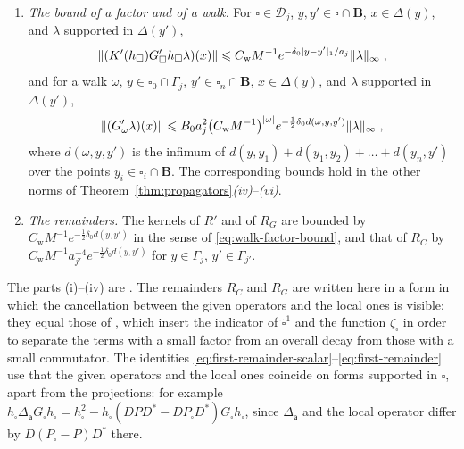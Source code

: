 \documentclass[11pt]{preprint}
\DeclarePairedDelimiter{\abs}{\lvert}{\rvert}
\DeclarePairedDelimiter{\norm}{\lVert}{\rVert}
\numberwithin{equation}{section}
\begin{document}
\begin{theorem}
\begin{enumerate}[label=(\roman*)]
\item \emph{The bound of a factor and of a walk.} For $\square \in \mathscr D_j$, $y, y' \in \square \cap \mathbf B$, $x \in \Delta(y)$, and $\lambda$ supported in $\Delta(y')$,
\begin{equation}\label{eq:walk-factor-bound}
    \norm{(K'(h_\square)G'_\square h_\square\lambda)(x)} \leqslant C_{\mathrm w}M^{-1}e^{-\delta_0\abs{y - y'}_1/a_j}\norm\lambda_\infty\;,
\end{equation}
and for a walk $\omega$, $y \in \square_0 \cap \Gamma_j$, $y' \in \square_n \cap \mathbf B$, $x \in \Delta(y)$, and $\lambda$ supported in $\Delta(y')$,
\begin{equation}\label{eq:walk-bound}
    \norm{(G'_\omega\lambda)(x)} \leqslant B_0a_j^2\bigl(C_{\mathrm w}M^{-1}\bigr)^{\abs\omega}e^{-\frac{1}{2}\delta_0d(\omega, y, y')}\norm\lambda_\infty\;,
\end{equation}
where $d(\omega, y, y')$ is the infimum of $d(y, y_1) + d(y_1, y_2) + \dots + d(y_n, y')$ over the points $y_i \in \square_i \cap \mathbf B$. The corresponding bounds hold in the other norms of Theorem~\ref{thm:propagators}\emph{(iv)}--\emph{(vi)}.
\item \emph{The remainders.} The kernels of $R'$ and of $R_G$ are bounded by $C_{\mathrm w}M^{-1}e^{-\frac{1}{2}\delta_0d(y, y')}$ in the sense of \eqref{eq:walk-factor-bound}, and that of $R_C$ by $C_{\mathrm w}M^{-1}a_{j'}^{-4}e^{-\frac{1}{2}\delta_0d(y, y')}$ for $y \in \Gamma_j$, $y' \in \Gamma_{j'}$.
\end{enumerate}
\end{theorem}

The parts (i)--(iv) are \cite[(3.87)--(3.96), (3.104)--(3.106), Theorem~3.7, Corollary~3.8]{BalabanPBG}. The remainders $R_C$ and $R_G$ are written here in a form in which the cancellation between the given operators and the local ones is visible; they equal those of \cite[(3.95), (3.105)]{BalabanPBG}, which insert the indicator of $\tilde\square^1$ and the function $\zeta_\square$ in order to separate the terms with a small factor from an overall decay from those with a small commutator. The identities \eqref{eq:first-remainder-scalar}--\eqref{eq:first-remainder} use that the given operators and the local ones coincide on forms supported in $\square$, apart from the projections: for example $h_\square\Delta_{\mathsf a}G_\square h_\square = h_\square^2 - h_\square(DPD^* - DP_\square D^*)G_\square h_\square$, since $\Delta_{\mathsf a}$ and the local operator differ by $D(P_\square - P)D^*$ there.
\end{document}
